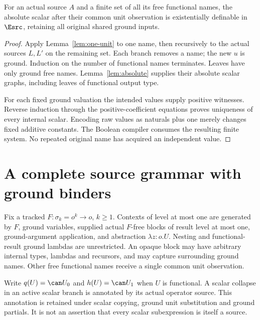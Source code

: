 \begin{theorem}\label{thm:unit-elimination}
For an actual source $A$ and a finite set of all its free functional names,
the absolute scalar after their common unit observation is existentially
definable in $\Esrc$, retaining all original shared ground inputs.
\end{theorem}
\begin{proof}
Apply Lemma~\ref{lem:one-unit} to one name, then recursively to the actual
sources $L,L'$ on the remaining set.  Each branch removes a name; the new
$u$ is ground.  Induction on the number of functional names terminates.
Leaves have only ground free names.  Lemma~\ref{lem:absolute} supplies their
absolute scalar graphs, including leaves of functional output type.

For each fixed ground valuation the intended values supply positive witnesses.
Reverse induction through the positive-coefficient equations proves uniqueness
of every internal scalar.  Encoding raw values as naturals plus one merely
changes fixed additive constants.  The Boolean compiler consumes the resulting
finite system.  No repeated original name has acquired an independent value.
\end{proof}

\section{A complete source grammar with ground binders}\label{sec:ground-binders}

Fix a tracked $F:\sigma_k=o^k\to o$, $k\ge1$.  Contexts of level at most
one are generated by $F$, ground variables, supplied actual $F$-free blocks
of result level at most one, ground-argument application, and abstraction
$\lambda z:o.U$.  Nesting and functional-result ground lambdas are unrestricted.
An opaque block may have arbitrary internal types, lambdas and recursors,
and may capture surrounding ground names.  Other free functional names
receive a single common unit observation.

Write $q(U)=\can U_0$ and $h(U)=\can U_1$ when $U$ is functional.
A scalar collapse in an active scalar branch is annotated by its actual
operator source.  This annotation is retained under scalar copying, ground
unit substitution and ground partials.  It is not an assertion that every
scalar subexpression is itself a source.

